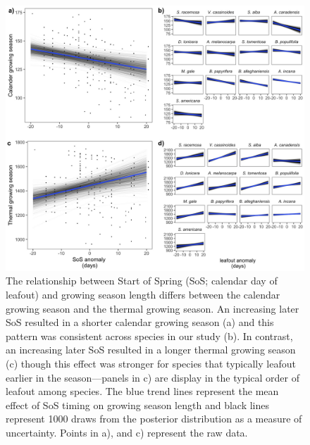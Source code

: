\documentclass{article}[12pt]
\begin{document}
\begin{figure}[h!]
    \centering
 \includegraphics[width=.8\textwidth]{..//analyses/figures/primarygrowingseason_modplots.jpeg}
    \caption{The relationship between Start of Spring (SoS; calendar day of leafout) and growing season length differs between the calendar growing season and the thermal growing season. An increasing later SoS resulted in a shorter calendar growing season (a) and this pattern was consistent across species in our study (b). In contrast, an increasing later SoS resulted in a longer thermal growing season (c) though this effect was stronger for species that typically leafout earlier in the season---panels in c) are display in the typical order of leafout among species. The blue trend lines represent the mean effect of SoS timing on growing season length and black lines represent 1000 draws from the posterior distribution as a measure of uncertainty. Points in a), and c) represent the raw data.}
    \label{fig:thermcal}
\end{figure}
\end{document}
